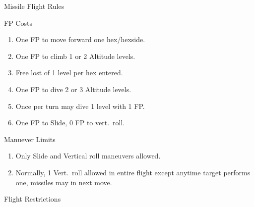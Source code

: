 \begin{table}
\centering\small
\caption{Missile Flight Rules}

\medskip
FP Costs
\medskip

\begin{enumerate}
    \item One FP to move forward one hex/hexside.
    \item One FP to climb 1 or 2 Altitude levels.
    \item Free lost of 1 level per hex entered.
    \item One FP to dive 2 or 3 Altitude levels.
    \item Once per turn may dive 1 level with 1 FP.
    \item One FP to Slide, 0 FP to vert.\ roll.
\end{enumerate}

\medskip

Manuever Limits
\medskip

\begin{enumerate}
    \item Only Slide and Vertical roll maneuvers allowed.
    \item Normally, 1 Vert.\ roll allowed in entire flight except anytime target performs one, missiles may in next move.
\end{enumerate}

\medskip

Flight Restrictions
\medskip


\end{table}
